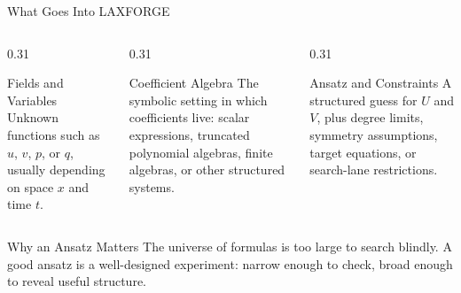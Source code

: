 \documentclass[aspectratio=169,11pt]{beamer}
\begin{document}
\begin{frame}{What Goes Into LAXFORGE}
  \begin{columns}[T,totalwidth=\textwidth]
    \begin{column}{0.31\textwidth}
      \begin{block}{Fields and Variables}
        Unknown functions such as $u$, $v$, $p$, or $q$, usually depending on
        space $x$ and time $t$.
      \end{block}
    \end{column}
    \begin{column}{0.31\textwidth}
      \begin{block}{Coefficient Algebra}
        The symbolic setting in which coefficients live: scalar expressions,
        truncated polynomial algebras, finite algebras, or other structured
        systems.
      \end{block}
    \end{column}
    \begin{column}{0.31\textwidth}
      \begin{block}{Ansatz and Constraints}
        A structured guess for $U$ and $V$, plus degree limits, symmetry
        assumptions, target equations, or search-lane restrictions.
      \end{block}
    \end{column}
  \end{columns}
  \vspace{0.35cm}
  \begin{block}{Why an Ansatz Matters}
    The universe of formulas is too large to search blindly. A good ansatz is a
    well-designed experiment: narrow enough to check, broad enough to reveal
    useful structure.
  \end{block}
\end{frame}
\end{document}
